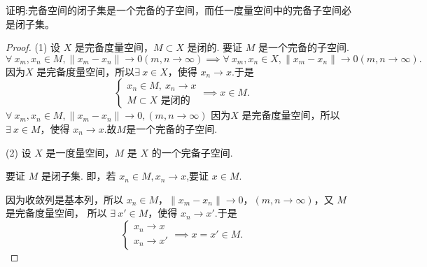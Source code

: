 \documentclass[../../main.tex]{subfiles}
\begin{document}
\begin{proposition}\label{proposition:习题1.1.1}
证明:完备空间的闭子集是一个完备的子空间，而任一度量空间中的完备子空间必是闭子集。
\end{proposition}
\begin{proof}
(1) 设 \( X \) 是完备度量空间，\( M \subset X \) 是闭的. 要证 \( M \) 是一个完备的子空间.
\[
\forall\ x_m, x_n \in M ,\|x_m - x_n\| \to 0 (m, n \to \infty)\implies \forall\ x_m, x_n \in X , \|x_m - x_n\| \to 0 (m, n \to \infty).
\]
因为\(X \) 是完备度量空间，所以\( \exists\ x \in X \)，使得 \( x_n \to x \).于是
\[
\begin{cases} 
x_n \in M,\ x_n \to x \\
M \subset X \text{ 是闭的}
\end{cases} \implies x \in M.
\]
\( \forall\ x_m, x_n \in M, \|x_m - x_n\| \to 0, (m, n \to \infty) \)
因为\(X \) 是完备度量空间，所以
\( \exists\ x \in M \)，使得 \( x_n \to x \).故$M$是一个完备的子空间.

(2) 设 \( X \) 是一度量空间，\( M \) 是 \( X \) 的一个完备子空间.

要证 \( M \) 是闭子集. 即，若 \( x_n \in M, x_n \to x \),要证 \( x \in M \).

因为收敛列是基本列，所以
\( x_n \in M \)，\( \|x_m - x_n\| \to 0 \)，\( (m, n \to \infty) \)，又 \( M \) 是完备度量空间，
所以 \( \exists\ x' \in M \)，使得 \( x_n \to x' \).于是
\[
\begin{cases} 
x_n \to x \\
x_n \to x'
\end{cases} \implies x = x' \in M.
\]

\end{proof}
\end{document}
